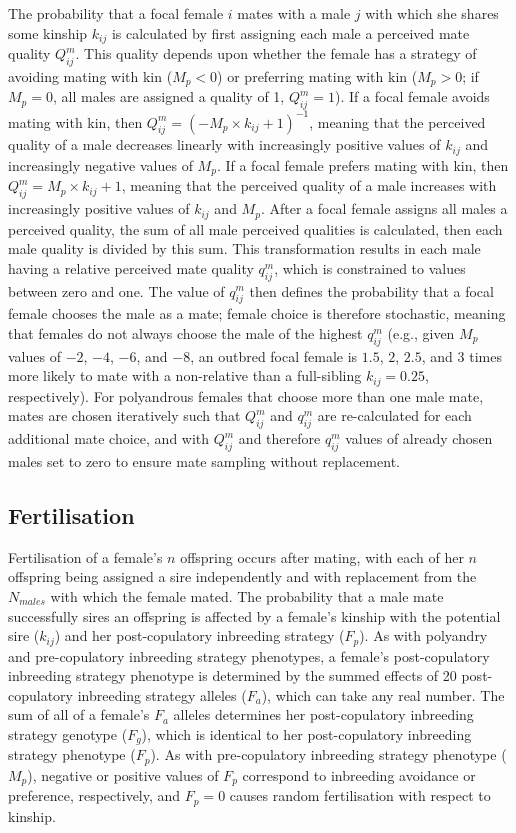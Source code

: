 \documentclass[10pt,letterpaper]{article}
\begin{document}
The probability that a focal female $i$ mates with a male $j$ with which she shares some kinship $k_{ij}$ is calculated by first assigning each male a perceived mate quality $Q^{m}_{ij}$. This quality depends upon whether the female has a strategy of avoiding mating with kin ($M_{p}<0$) or preferring mating with kin ($M_{p}>0$; if $M_{p}=0$, all males are assigned a quality of 1, $Q^{m}_{ij}=1$). If a focal female avoids mating with kin, then $Q^{m}_{ij} = (-M_{p} \times k_{ij} + 1)^{-1}$, meaning that the perceived quality of a male decreases linearly with increasingly positive values of $k_{ij}$ and increasingly negative values of $M_{p}$. If a focal female prefers mating with kin, then $Q^{m}_{ij} = M_{p} \times k_{ij} + 1$, meaning that the perceived quality of a male increases with increasingly positive values of $k_{ij}$ and $M_{p}$. After a focal female assigns all males a perceived quality, the sum of all male perceived qualities is calculated, then each male quality is divided by this sum. This transformation results in each male having a relative perceived mate quality $q^{m}_{ij}$, which is constrained to values between zero and one. The value of $q^{m}_{ij}$ then defines the probability that a focal female chooses the male as a mate; female choice is therefore stochastic, meaning that females do not always choose the male of the highest $q^{m}_{ij}$ (e.g., given $M_{p}$ values of $-2$, $-4$, $-6$, and $-8$, an outbred focal female is $1.5$, $2$, $2.5$, and $3$ times more likely to mate with a non-relative than a full-sibling $k_{ij}=0.25$, respectively). For polyandrous females that choose more than one male mate, mates are chosen iteratively such that $Q^{m}_{ij}$ and $q^{m}_{ij}$ are re-calculated for each additional mate choice, and with $Q^{m}_{ij}$ and therefore $q^{m}_{ij}$ values of already chosen males set to zero to ensure mate sampling without replacement.

\subsection*{Fertilisation}

Fertilisation of a female's $n$ offspring occurs after mating, with each of her $n$ offspring being assigned a sire independently and with replacement from the $N_{males}$ with which the female mated. The probability that a male mate successfully sires an offspring is affected by a female's kinship with the potential sire ($k_{ij}$) and her post-copulatory inbreeding strategy ($F_{p}$). As with polyandry and pre-copulatory inbreeding strategy phenotypes, a female's post-copulatory inbreeding strategy phenotype is determined by the summed effects of 20 post-copulatory inbreeding strategy alleles ($F_{a}$), which can take any real number. The sum of all of a female's $F_{a}$ alleles determines her post-copulatory inbreeding strategy genotype ($F_{g}$), which is identical to her post-copulatory inbreeding strategy phenotype ($F_{p}$). As with pre-copulatory inbreeding strategy phenotype ($M_{p}$), negative or positive values of $F_{p}$ correspond to inbreeding avoidance or preference, respectively, and $F_{p}=0$ causes random fertilisation with respect to kinship. 
\end{document}
